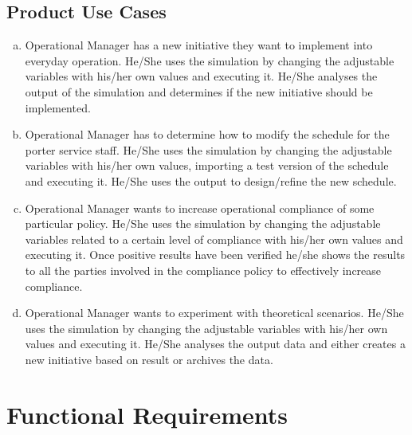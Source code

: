 \documentclass[paper=letter, fontsize=10pt]{scrartcl}
\numberwithin{equation}{section}		%
\numberwithin{figure}{section}			%
\numberwithin{table}{section}				%
\begin{document}
\subsection{Product Use Cases}
\begin{enumerate}[(a)]
	\item Operational Manager has a new initiative they want to implement into everyday operation. He/She uses the simulation by changing the adjustable variables with his/her own values and executing it. He/She analyses the output of the simulation and determines if the new initiative should be implemented.
	\item Operational Manager has to determine how to modify the schedule for the porter service staff. He/She uses the simulation by changing the adjustable variables with his/her own values, importing a test version of the schedule and executing it. He/She uses the output to design/refine the new schedule.
	\item Operational Manager wants to increase operational compliance of some particular policy. He/She uses the simulation by changing the adjustable variables related to a certain level of compliance with his/her own values and executing it. Once positive results have been verified he/she shows the results to all the parties involved in the compliance policy to effectively increase compliance.
	\item Operational Manager wants to experiment with theoretical scenarios. He/She uses the simulation by changing the adjustable variables with his/her own values and executing it. He/She analyses the output data and either creates a new initiative based on result or archives the data.     
\end{enumerate}

\section{Functional Requirements}
\end{document}
